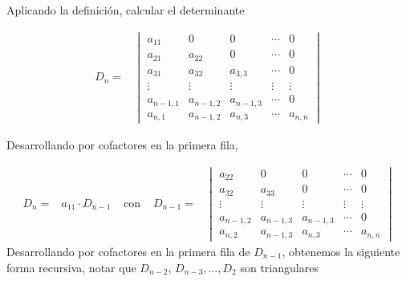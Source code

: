 \documentclass[
]{article}
\begin{document}
Aplicando la definición, calcular el determinante

\begin{equation*}
\begin{array}{cc}
D_n = &  \begin{vmatrix} 
          a_{11}     & 0           & 0            & \cdots     & 0      \\ 
          a_{21}     & a_{22}      & 0            & \cdots     & 0      \\
          a_{31}     &  a_{32}     & a_{3,3}      &  \cdots    & 0      \\
          \vdots      & \vdots      & \vdots       & \vdots     & \vdots \\
          a_{n-1,1}  & a_{n-1,2}   & a_{n-1,3}    & \cdots     & 0      \\
          a_{n,1}     &  a_{n-1,2} & a_{n,3}      & \cdots     & a_{n,n}
  \end{vmatrix}
\end{array}
\end{equation*}

Desarrollando por cofactores en la primera fila,

\begin{equation*}
\begin{array}{ccccc}
D_n =& a_{11}\cdot D_{n-1} &\mbox{ con } & D_{n-1}  = & \begin{vmatrix} 
                                                    a_{22}     & 0           & 0            & \cdots     & 0      \\ 
                                                    a_{32}     & a_{33}      & 0            & \cdots     & 0      \\
                                                    \vdots     & \vdots      & \vdots       & \vdots     & \vdots \\
                                                    a_{n-1,2}  & a_{n-1,3}   & a_{n-1,3}    & \cdots     & 0      \\
                                                    a_{n,2}    &  a_{n-1,3}  & a_{n,3}      & \cdots     & a_{n,n}
                                                  \end{vmatrix}
\end{array}
\end{equation*} Desarrollando por cofactores en la primera fila de
\(D_{n-1}\), obtenemos la siguiente forma recursiva, notar que
\(D_{n-2}\), \(D_{n-3},\ldots,D_2\) son triangulares
\end{document}
